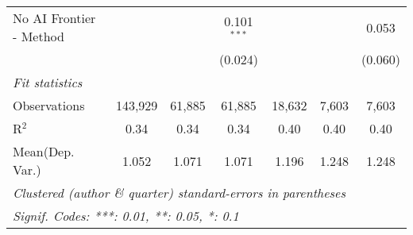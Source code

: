 \begin{tabular}{lcccccc}
   No AI Frontier - Method &              &               & 0.101$^{***}$ &              &              & 0.053\\   
                           &              &               & (0.024)       &              &              & (0.060)\\   
   \midrule
   \emph{Fit statistics}\\
   Observations            & 143,929      & 61,885        & 61,885        & 18,632       & 7,603        & 7,603\\  
   R$^2$                   & 0.34         & 0.34          & 0.34          & 0.40         & 0.40         & 0.40\\  
Mean(Dep. Var.) & 1.052 & 1.071 & 1.071 & 1.196 & 1.248 & 1.248 \\
   \midrule \midrule
   \multicolumn{7}{l}{\emph{Clustered (author \& quarter) standard-errors in parentheses}}\\
   \multicolumn{7}{l}{\emph{Signif. Codes: ***: 0.01, **: 0.05, *: 0.1}}\\
\end{tabular}
\par\endgroup
